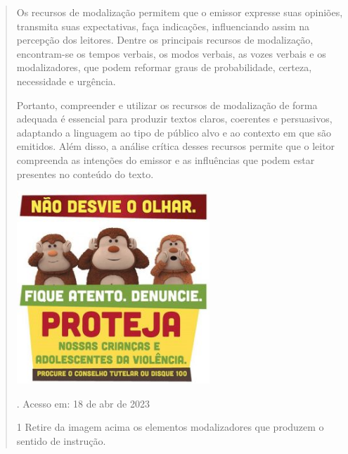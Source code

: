 \begin{quote}
{Os recursos de modalização permitem que o emissor expresse suas
opiniões, transmita suas expectativas, faça indicações, influenciando
assim na percepção dos leitores. Dentre os principais recursos
de modalização, encontram-se os tempos verbais, os modos verbais, as
vozes verbais e os modalizadores, que podem reformar graus de
probabilidade, certeza, necessidade e urgência.

Portanto, compreender e utilizar os recursos de modalização de forma
adequada é essencial para produzir textos claros, coerentes e
persuasivos, adaptando a linguagem ao tipo de público alvo e ao contexto
em que são emitidos. Além disso, a análise crítica desses recursos
permite que o leitor compreenda as intenções do emissor e as influências
que podem estar presentes no conteúdo do texto.}



\includegraphics[width=2.85536in,height=2.85536in]{./imgSAEB_7_POR/media/image9.png}

.
Acesso em: 18 de abr de 2023

\num{1} Retire da imagem acima os elementos modalizadores que produzem o sentido de instrução.


\end{quote}
